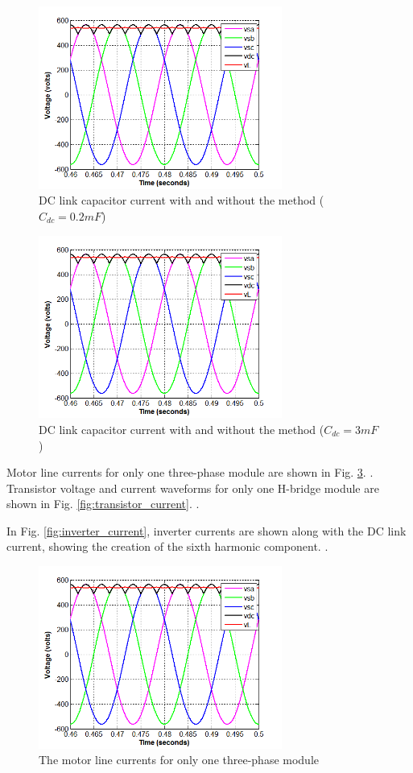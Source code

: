 \documentclass[conference,a4paper,twocolumn]{IEEEtran}
\begin{document}
\begin{figure}[h]
  \centering
  \includegraphics[width=8cm]{images/sample}
  \caption{DC link capacitor current with and without the method ($C_{dc} = 0.2 mF$)}
  \label{fig:cap_current}
\end{figure}

\begin{figure}[h]
  \centering
  \includegraphics[width=8cm]{images/sample}
  \caption{DC link capacitor current with and without the method ($C_{dc} = 3 mF$)}
  \label{fig:cap_current2}
\end{figure}

Motor line currents for only one three-phase module are shown in Fig. \ref{fig:motor_current}. . Transistor voltage and current waveforms for only one H-bridge module are shown in Fig. \ref{fig:transistor_current}. .
 
In Fig. \ref{fig:inverter_current}, inverter currents are shown along with the DC link current, showing the creation of the sixth harmonic component. .

\begin{figure}[h]
  \centering
  \includegraphics[width=8cm]{images/sample}
  \caption{The motor line currents for only one three-phase module}
  \label{fig:motor_current}
\end{figure}
\end{document}
